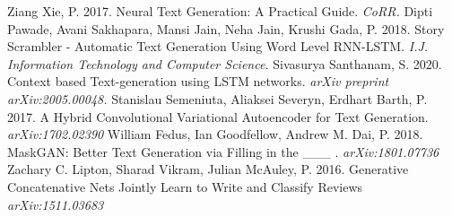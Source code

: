 \documentclass[a4paper]{article}
\begin{document}
\footnotesize
\begin{thebibliography}{99}
 Ziang Xie, P. 2017. Neural Text Generation: A Practical Guide. \emph{CoRR.}
 Dipti Pawade, Avani Sakhapara, Mansi Jain, Neha Jain, Krushi Gada, P. 2018. Story Scrambler - Automatic Text Generation Using Word Level RNN-LSTM. \emph{I.J. Information Technology and Computer Science.}
 Sivasurya Santhanam, S. 2020. Context based Text-generation using LSTM networks. \emph {arXiv preprint arXiv:2005.00048.}
 Stanislau Semeniuta, Aliaksei Severyn, Erdhart Barth, P. 2017. A Hybrid Convolutional Variational Autoencoder for Text Generation. \emph{arXiv:1702.02390}
 William Fedus, Ian Goodfellow, Andrew M. Dai, P. 2018. MaskGAN: Better Text Generation via Filling in the \_\_\_ . \emph{arXiv:1801.07736}
 Zachary C. Lipton, Sharad Vikram, Julian McAuley, P. 2016. Generative Concatenative Nets Jointly Learn to Write and Classify Reviews \emph{arXiv:1511.03683}
\end{thebibliography}
\end{document}
